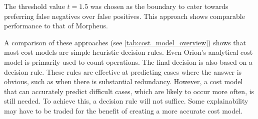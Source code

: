 The threshold value $t = 1.5 $ was chosen as the boundary to cater towards preferring false negatives over false positives. This approach shows comparable performance to that of Morpheus.

A comparison of these approaches (see \autoref{tab:cost_model_overview}) shows that most cost models are simple heuristic decision rules. Even Orion's analytical cost model is primarily used to count operations. The final decision is also based on a decision rule. These rules are effective at predicting cases where the answer is obvious, such as when there is substantial redundancy. However, a cost model that can accurately predict difficult cases, which are likely to occur more often, is still needed. To achieve this, a decision rule will not suffice. Some explainability may have to be traded for the benefit of creating a more accurate cost model.

